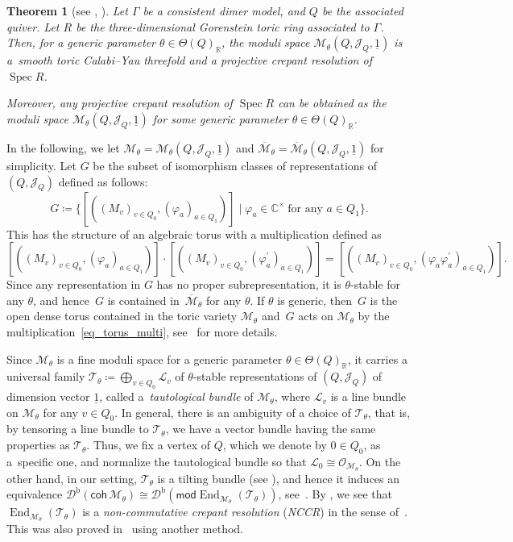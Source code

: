\documentclass[10pt,a4paper]{amsart}
\numberwithin{equation}{section}
\newtheorem{Theorem}{Theorem}[section]
\theoremstyle{definition}
\newcommand{\RR}{\mathbb{R}}
\newcommand{\CC}{\mathbb{C}}
\newcommand{\calD}{\mathcal{D}}
\newcommand{\calJ}{\mathcal{J}}
\newcommand{\calL}{\mathcal{L}}
\newcommand{\calM}{\mathcal{M}}
\newcommand{\calO}{\mathcal{O}}
\newcommand{\calT}{\mathcal{T}}
\newcommand{\Spec}{\operatorname{Spec}}
\newcommand{\End}{\operatorname{End}}
\newcommand{\barone}{\underline{1}}
\begin{document}
\begin{Theorem}[{see \cite[Theorems~6.3 and 6.4]{IU_moduli}, \cite[Corollary~1.2]{IU_anycrepant}}]
\label{thm_crepant_dimer}
Let $\Gamma$ be a consistent dimer model, and $Q$ be the associated quiver.
Let $R$ be the three-dimensional Gorenstein toric ring associated to $\Gamma$.
Then, for a generic parameter $\theta\in\Theta(Q)_\RR$, the moduli space $\calM_\theta(Q,\calJ_Q, \barone)$ is a~smooth toric Calabi--Yau threefold
and a projective crepant resolution of $\Spec R$.

Moreover, any projective crepant resolution of $\Spec R$ can be obtained as the moduli space $\calM_\theta(Q,\calJ_Q, \barone)$ for some generic parameter $\theta\in\Theta(Q)_\RR$.
\end{Theorem}

In the following, we let $\calM_\theta=\calM_\theta(Q,\calJ_Q, \barone)$ and $\overline{\calM}_\theta=\overline{\calM}_\theta(Q,\calJ_Q, \barone)$ for simplicity.
Let $G$ be the subset of isomorphism classes of representations of $(Q,\calJ_Q)$ defined as follows:
\[
G\coloneqq \bigl\{ [((M_v)_{v\in Q_0}, (\varphi_a)_{a\in Q_1}) ] \mid \varphi_a\in \CC^\times \ \text{for any $a\in Q_1$} \bigr\}.
\]
This has the structure of an algebraic torus with a multiplication defined as
\begin{equation}
\label{eq_torus_multi}
 [((M_v)_{v\in Q_0}, (\varphi_a)_{a\in Q_1}) ]\cdot [((M_v)_{v\in Q_0}, (\varphi^\prime_a)_{a\in Q_1}) ]
= [((M_v)_{v\in Q_0}, (\varphi_a\varphi^\prime_a)_{a\in Q_1}) ].
\end{equation}
Since any representation in $G$ has no proper subrepresentation, it is $\theta$-stable for any $\theta$,
and hence~$G$ is contained in~$\overline{\calM}_\theta$ for any $\theta$.
If $\theta$ is generic, then~$G$ is the open dense torus contained in the toric variety $\calM_\theta$
and~$G$ acts on $\calM_\theta$ by the multiplication~\eqref{eq_torus_multi}, see~\cite{IU_moduli} for more details.

Since $\calM_\theta$ is a fine moduli space for a generic parameter $\theta\in\Theta(Q)_\RR$,
it carries a universal family $\calT_\theta\coloneqq \bigoplus_{v\in Q_0}\calL_v$
of $\theta$-stable representations of $(Q,\calJ_Q)$ of dimension vector $\barone$, called a~\emph{tautological bundle} of $\calM_\theta$,
where $\calL_v$ is a line bundle on $\calM_\theta$ for any $v\in Q_0$.
In general, there is an ambiguity of a choice of $\calT_\theta$, that is, by tensoring a line bundle to $\calT_\theta$,
we have a vector bundle having the same properties as $\calT_\theta$.
Thus, we fix a vertex of $Q$, which we denote by $0\in Q_0$, as a~specific one, and normalize the tautological bundle so that $\calL_0\cong\calO_{\calM_\theta}$.
On the other hand, in our setting, $\calT_\theta$ is a tilting bundle (see \cite[Theorem~1.4]{IU_special}), and hence it induces an equivalence $\calD^\mathrm{b}(\mathsf{coh}\,\calM_\theta)\cong\calD^\mathrm{b}(\mathsf{mod} \End_{\calM_\theta}(\calT_\theta))$, see~\cite{Bondal_SEC,Rickard_morita}.
By \cite[Corollary~4.15]{IW_singular}, we see that $\End_{\calM_\theta}(\calT_\theta)$
is a \emph{non-commutative crepant resolution} (\emph{NCCR}) in the sense of~\cite{VdB_NCCR}.
This was also proved in~\cite{Bro_dimer} using another method.
\end{document}
